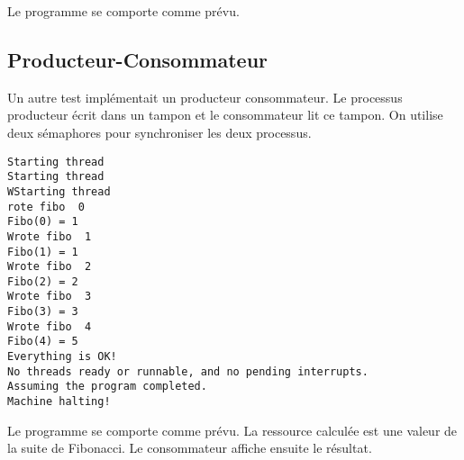 \documentclass{article}
\begin{document}
Le programme se comporte comme prévu.

\subsection{Producteur-Consommateur}
Un autre test implémentait un producteur consommateur. Le processus producteur écrit dans un tampon et le consommateur lit ce tampon. On utilise deux sémaphores pour synchroniser les deux processus.

\begin{lstlisting}
Starting thread
Starting thread
WStarting thread
rote fibo  0
Fibo(0) = 1
Wrote fibo  1
Fibo(1) = 1
Wrote fibo  2
Fibo(2) = 2
Wrote fibo  3
Fibo(3) = 3
Wrote fibo  4
Fibo(4) = 5
Everything is OK!
No threads ready or runnable, and no pending interrupts.
Assuming the program completed.
Machine halting!
\end{lstlisting}

Le programme se comporte comme prévu. La ressource calculée est une valeur de la suite de Fibonacci. Le consommateur affiche ensuite le résultat.

\end{document}
